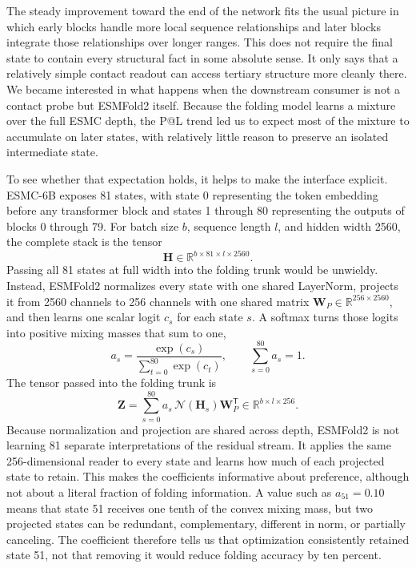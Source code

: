 \documentclass[11pt]{article}
\newcommand{\ESMC}{ESMC-6B\xspace}
\newcommand{\ESMFold}{ESMFold2\xspace}
\newcommand{\R}{\mathbb{R}}
\newcommand{\mat}[1]{\mathbf{#1}}
\begin{document}
The steady improvement toward the end of the network fits the usual picture in which early blocks handle more local sequence relationships and later blocks integrate those relationships over longer ranges. This does not require the final state to contain every structural fact in some absolute sense. It only says that a relatively simple contact readout can access tertiary structure more cleanly there. We became interested in what happens when the downstream consumer is not a contact probe but \ESMFold itself. Because the folding model learns a mixture over the full ESMC depth, the P@L trend led us to expect most of the mixture to accumulate on later states, with relatively little reason to preserve an isolated intermediate state.

To see whether that expectation holds, it helps to make the interface explicit. \ESMC exposes 81 states, with state 0 representing the token embedding before any transformer block and states 1 through 80 representing the outputs of blocks 0 through 79. For batch size $b$, sequence length $l$, and hidden width 2560, the complete stack is the tensor
\[
\mat{H}\in\R^{b\times81\times l\times2560}.
\]
Passing all 81 states at full width into the folding trunk would be unwieldy. Instead, \ESMFold normalizes every state with one shared LayerNorm, projects it from 2560 channels to 256 channels with one shared matrix $\mat{W}_{P}\in\R^{256\times2560}$, and then learns one scalar logit $c_s$ for each state $s$. A softmax turns those logits into positive mixing masses that sum to one,
\begin{equation}
a_s=\frac{\exp(c_s)}{\sum_{t=0}^{80}\exp(c_t)},
\qquad \sum_{s=0}^{80}a_s=1.
\label{eq:mixer}
\end{equation}
The tensor passed into the folding trunk is
\begin{equation}
\mat{Z}=\sum_{s=0}^{80}a_s\,\mathcal{N}(\mat{H}_s)\mat{W}_{P}^{\mathsf T}
\in\R^{b\times l\times256}.
\label{eq:foldinput}
\end{equation}
Because normalization and projection are shared across depth, \ESMFold is not learning 81 separate interpretations of the residual stream. It applies the same 256-dimensional reader to every state and learns how much of each projected state to retain. This makes the coefficients informative about preference, although not about a literal fraction of folding information. A value such as $a_{51}=0.10$ means that state 51 receives one tenth of the convex mixing mass, but two projected states can be redundant, complementary, different in norm, or partially canceling. The coefficient therefore tells us that optimization consistently retained state 51, not that removing it would reduce folding accuracy by ten percent.
\end{document}
